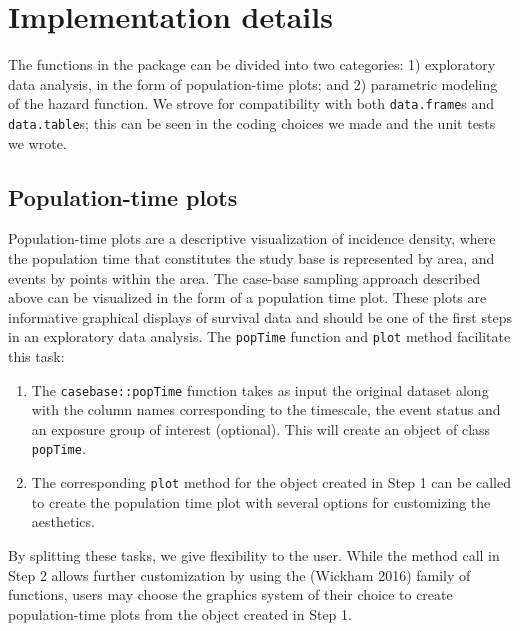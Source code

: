 \hypertarget{implementation-details}{%
\section{Implementation details}\label{implementation-details}}

The functions in the  package can be divided into two categories: 1) exploratory data analysis, in the form of population-time plots; and 2) parametric modeling of the hazard function. We strove for compatibility with both \texttt{data.frame}s and \texttt{data.table}s; this can be seen in the coding choices we made and the unit tests we wrote.

\hypertarget{population-time-plots}{%
\subsection{Population-time plots}\label{population-time-plots}}

Population-time plots are a descriptive visualization of incidence density, where the population time that constitutes the study base is represented by area, and events by points within the area. The case-base sampling approach described above can be visualized in the form of a population time plot. These plots are informative graphical displays of survival data and should be one of the first steps in an exploratory data analysis. The \texttt{popTime} function and \texttt{plot} method facilitate this task:

\begin{enumerate}
\def\labelenumi{\arabic{enumi}.}
\tightlist
\item
  The \texttt{casebase::popTime} function takes as input the original dataset along with the column names corresponding to the timescale, the event status and an exposure group of interest (optional). This will create an object of class \texttt{popTime}.\\
\item
  The corresponding \texttt{plot} method for the object created in Step 1 can be called to create the population time plot with several options for customizing the aesthetics.
\end{enumerate}

By splitting these tasks, we give flexibility to the user. While the method call in Step 2 allows further customization by using the  (Wickham 2016) family of functions, users may choose the graphics system of their choice to create population-time plots from the object created in Step 1.

